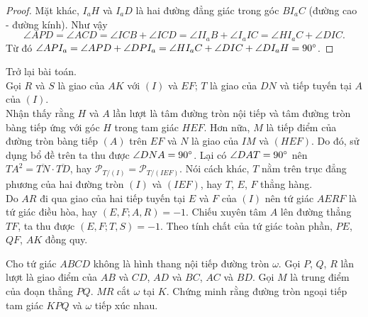 \begin{solution}
\begin{enumerate}
\begin{proof}
                Mặt khác, \(I_aH\) và \(I_aD\) là hai đường đẳng giác trong góc \(BI_aC\) (đường cao - đường kính). Như vậy
                \[\angle APD = \angle ACD = \angle ICB + \angle ICD = \angle II_aB + \angle I_aIC = \angle HI_aC + \angle DIC.\]
                Từ đó \(\angle API_a = \angle APD + \angle DPI_a = \angle HI_aC + \angle DIC + \angle DI_aH = 90 \degree\).
            \end{proof}
            Trở lại bài toán.\\
            Gọi \(R\) và \(S\) là giao của \(AK\) với \((I)\) và \(EF\); \(T\) là giao của \(DN\) và tiếp tuyến tại \(A\) của \((I)\).\\
            Nhận thấy rằng \(H\) và \(A\) lần lượt là tâm đường tròn nội tiếp và tâm đường tròn bàng tiếp ứng với góc \(H\) trong tam giác \(HEF\). Hơn nữa, \(M\) là tiếp điểm của đường tròn bàng tiếp \((A)\) trên \(EF\) và \(N\) là giao của \(IM\) và \((HEF)\). Do đó, sử dụng bổ đề trên ta thu được \(\angle DNA = 90 \degree\). Lại có \(\angle DAT = 90 \degree\) nên \(TA^2 = \overline{TN} \cdot \overline{TD}\), hay \(\mathcal{P}_{T/(I)} = \mathcal{P}_{T/(IEF)}\). Nói cách khác, \(T\) nằm trên trục đẳng phương của hai đường tròn \((I)\) và \((IEF)\), hay \(T\), \(E\), \(F\) thẳng hàng.\\
            Do \(AR\) đi qua giao của hai tiếp tuyến tại \(E\) và \(F\) của \((I)\) nên tứ giác \(AERF\) là tứ giác điều hòa, hay \((E,F;A,R) = -1\). Chiếu xuyên tâm \(A\) lên đường thẳng \(TF\), ta thu được \((E,F;T,S) = -1\). Theo tính chất của tứ giác toàn phần, \(PE\), \(QF\), \(AK\) đồng quy.
        \end{enumerate}
    \end{solution}

    \begin{problem}
        Cho tứ giác \(ABCD\) không là hình thang nội tiếp đường tròn \(\omega\). Gọi \(P\), \(Q\), \(R\) lần lượt là giao điểm của \(AB\) và \(CD\), \(AD\) và \(BC\), \(AC\) và \(BD\). Gọi \(M\) là trung điểm của đoạn thẳng \(PQ\). \(MR\) cắt \(\omega\) tại \(K\). Chứng minh rằng đường tròn ngoại tiếp tam giác \(KPQ\) và \(\omega\) tiếp xúc nhau.
    \end{problem}

